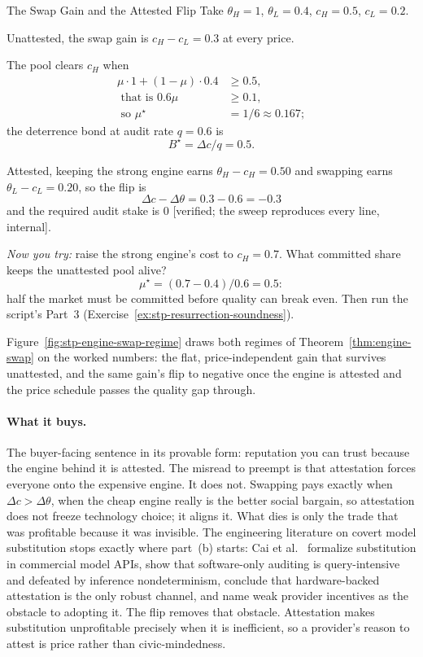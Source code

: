 \documentclass[11pt,a4paper]{article}
\theoremstyle{definition}
\begin{document}
\begin{pdexample}{The Swap Gain and the Attested Flip}
\setlength{\parskip}{4pt plus 1pt}
Take $\theta_H=1$, $\theta_L=0.4$, $c_H=0.5$, $c_L=0.2$.

Unattested, the swap
gain is $c_H-c_L=0.3$ at every price.

The pool clears $c_H$ when
\[
\begin{aligned}
\mu\cdot 1+(1-\mu)\cdot 0.4 &\ge 0.5,\\
\text{ that is }0.6\mu &\ge 0.1,\\
\text{ so }\mu^\star &=1/6\approx 0.167;
\end{aligned}
\]
the deterrence bond at audit rate
$q=0.6$ is
\[
B^\star=\Delta c/q=0.5.
\]

Attested, keeping the strong
engine earns $\theta_H-c_H=0.50$ and swapping earns $\theta_L-c_L=0.20$, so the flip is
\[
\Delta c-\Delta\theta=0.3-0.6=-0.3
\]
and the required audit stake
is $0$ [verified; the sweep reproduces every line, internal].

\emph{Now you
try:} raise the strong engine's cost to $c_H=0.7$. What committed share keeps
the unattested pool alive?
\[
\mu^\star=(0.7-0.4)/0.6=0.5:
\]
half the market
must be committed before quality can break even. Then run the
script's Part~3 (Exercise~\ref{ex:stp-resurrection-soundness}).
\end{pdexample}

Figure~\ref{fig:stp-engine-swap-regime} draws both regimes of
Theorem~\ref{thm:engine-swap} on the worked numbers: the flat, price-independent
gain that survives unattested, and the same gain's flip to negative once the
engine is attested and the price schedule passes the quality gap through.



\paragraph{What it buys.} The buyer-facing sentence in its provable form:
reputation you can trust because the engine behind it is attested. The
misread to preempt is that attestation forces everyone onto the expensive
engine. It does not. Swapping pays exactly when $\Delta c>\Delta\theta$, when
the cheap engine really is the better social bargain, so attestation does not
freeze technology choice; it aligns it. What dies is only the trade that was
profitable because it was invisible. The engineering literature on covert
model substitution stops exactly where part~(b) starts: Cai et
al.~ formalize substitution in commercial model APIs, show that
software-only auditing is query-intensive and defeated by inference
nondeterminism, conclude that hardware-backed attestation is the only robust
channel, and name weak provider incentives as the obstacle to adopting it. The
flip removes that obstacle. Attestation makes substitution unprofitable
precisely when it is inefficient, so a provider's reason to attest is price
rather than civic-mindedness.
\end{document}
